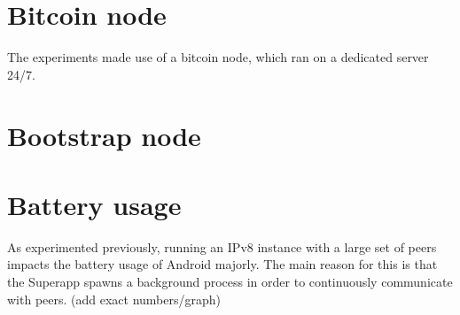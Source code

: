 \section{Bitcoin node}
The experiments made use of a bitcoin node, which ran on a dedicated server 24/7.
\section{Bootstrap node}
\section{Battery usage}
As \citep{mattskala2020} experimented previously, running an IPv8 instance with a large set of peers impacts the battery usage of Android majorly. The main reason for this is that the Superapp spawns a background process in order to continuously communicate with peers. (add exact numbers/graph)